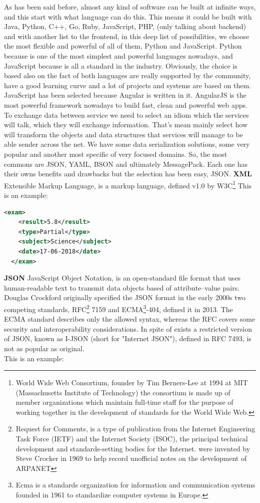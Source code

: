 As has been said before, almost any kind of software can be built at infinite
ways, and this start with what language can do this. This means it could be
built with Java, Python, C++, Go, Ruby, JavaScript, PHP,  (only talking about
backend) and with another list to the frontend, in this deep list of possibilities,
we choose the most flexible and powerful of all of them, Python and JavaScript.
\intro
Python because is one of the most simplest and powerful languages nowadays, and
JavaScript because is all a standard in the industry. Obviously, the choice is
based also on the fact of both languages are really supported by the community, have a
good learning curve and a lot of projects and systems are based on them.
\intro
JavaScript has been selected because Angular is written in it. AngularJS is the
most powerful framework nowadays to build fast, clean and powerful web apps.
\intro
To exchange data between service we need to select an idiom which the services
will talk, which they will exchange information. That's mean mainly select how
will transform the objects and data structures that services will manage to be able
sender across the net.
\intro
We have some data serialization solutions, some very popular and another most
specific of very focused domains. So, the most commons are JSON, YAML,
BSON and ultimately MessagePack. Each one has their owns benefits and drawbacks but
the selection has been easy, JSON.
\intro
\textbf{XML}
\intro
Extensible Markup Language, is a markup language, defined v1.0 by
W3C\footnote{World Wide Web Consortium, founder by Tim Berners-Lee at 1994 at MIT
(Massachusetts Institute of Technology) the consortium is made up of member
organizations which maintain full-time staff for the purpose of working together
in the development of standards for the World Wide Web.} This is an example:

\begin{lstlisting}[language=xml,frame=none,numbers=none]
  <exam>
    <result>5.8</result>
    <type>Partial</type>
    <subject>Science</subject>
    <date>17-06-2018</date>
  </exam>
\end{lstlisting}


\noindent \textbf{JSON}
\intro
JavaScript Object Notation, is an open-standard file format that uses
human-readable text to transmit data objects based of attribute–value pairs.
Douglas Crockford originally specified the JSON format in the early 2000s
two competing standards, RFC\footnote{ Request for Comments, is a type of
publication from the Internet Engineering Task Force (IETF) and the Internet
Society (ISOC), the principal technical development and standards-setting bodies
for the Internet. were invented by Steve Crocker in 1969 to help record
unofficial notes on the development of ARPANET} 7159 and ECMA\footnote{Ecma is a
standards organization for information and communication systems founded in 1961
to standardize computer systems in Europe.}-404, defined it in 2013.
The ECMA standard describes only the allowed syntax, whereas the RFC covers some
 security and interoperability considerations.
\intro
In spite of exists a restricted version of JSON, known as I-JSON (short for "Internet JSON"),
defined in RFC 7493, is not as popular as original.
\\This is an example:

